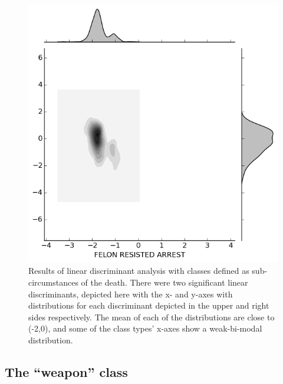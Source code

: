 \documentclass{evanarticle}
\begin{document}
\begin{figure}[H]
\begin{minipage}[b]{0.30\linewidth}
  \end{minipage}
  \quad
  \begin{minipage}[b]{0.30\linewidth}
    \includegraphics[width=\linewidth]{images/subcircum/FELON_RESISTED_ARREST.png}
  \end{minipage}
  \caption{Results of linear discriminant analysis with classes defined as sub-circumstances of the death.  There were two significant linear discriminants, depicted here with the x- and y-axes with distributions for each discriminant depicted in the upper and right sides respectively.  The mean of each of the distributions are close to (-2,0), and some of the class types' x-axes show a weak-bi-modal distribution.}
\end{figure}

\subsection{The ``weapon'' class}
\end{document}

